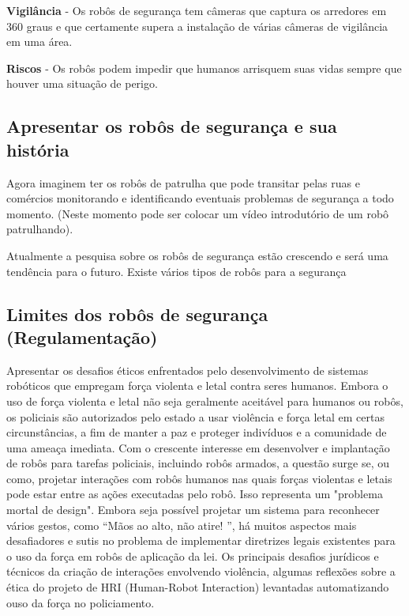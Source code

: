 \documentclass[12pt,a4paper]{article}
\begin{document}
    \textbf{Vigilância} - Os robôs de segurança tem câmeras que captura os arredores em 360 graus e que certamente supera a instalação de várias câmeras de vigilância em uma área.

    \textbf{Riscos} - Os robôs podem impedir que humanos arrisquem suas vidas sempre que houver uma situação de perigo.

    \subsection{Apresentar os robôs de segurança e sua história}
    Agora imaginem ter os robôs de patrulha que pode transitar pelas ruas e comércios monitorando e identificando eventuais problemas de segurança a todo momento.  (Neste momento pode ser colocar um vídeo introdutório de um robô patrulhando).

    Atualmente a pesquisa sobre os robôs de segurança estão crescendo e será uma tendência para o futuro. Existe vários tipos de robôs para a segurança


    \subsection{Limites dos robôs de segurança (Regulamentação)}
    Apresentar os desafios éticos enfrentados pelo desenvolvimento de sistemas robóticos que empregam força violenta e letal contra seres humanos. Embora o uso de força violenta e letal não seja geralmente aceitável para humanos ou robôs, os policiais são autorizados pelo estado a usar violência e força letal em certas circunstâncias, a fim de manter a paz e proteger indivíduos e a comunidade de uma ameaça imediata. Com o crescente interesse em desenvolver e implantação de robôs para tarefas policiais, incluindo robôs armados, a questão surge se, ou como, projetar interações com robôs humanos nas quais forças violentas e letais pode estar entre as ações executadas pelo robô. Isso representa um "problema mortal de design". Embora seja possível projetar um sistema para reconhecer vários gestos, como “Mãos ao alto, não atire! ”, há muitos aspectos mais desafiadores e sutis no problema de implementar diretrizes legais existentes para o uso da força em robôs de aplicação da lei. Os principais desafios jurídicos e técnicos da criação de interações envolvendo violência, algumas reflexões sobre a ética do projeto de HRI (Human-Robot Interaction) levantadas automatizando ouso da força no policiamento.  
\end{document}
